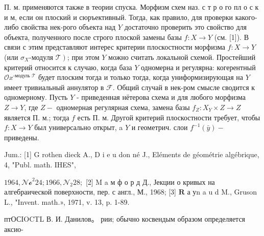 \documentclass[10pt]{article}
\begin{document}
П. м. применяются также в теории спуска. Морфизм схем наз. с т р о го пл о с к и м, если он плоский и сюръективный. Тогда, как правило, для проверки какого-либо свойства нек-рого объекта над $Y$ достаточно проверить это свойство для объекта, полученного после строго плоской замены базы $f: X \rightarrow Y$ (см. [1]). В связи с этим представляют интерес критерии плоскостности морфизма $f: X \rightarrow Y$ (или $\sigma_{X}$-модуля $\left.\mathscr{T}\right)$; при этом $Y$ можно считать локальной схемой. Простейший критерий относится к случаю, когда база $Y$ одномерна и регулярна: когерентный $\mathcal{O} x^{\text {-модуль } \mathscr{T}}$ будет плоским тогда и только тогда, когда униформизирующая на $Y$ имеет тривиальный аннулятор в $\mathscr{F}$. Общий случай в нек-ром смысле сводится к одномерному. Пусть $Y$ - приведенная нётерова схема и для любого морфизма $Z \rightarrow Y$, где $Z-$ одномерная регулярная схема, замена базы $f_{Z}: X_{Y} \times Z \rightarrow Z$ является П. м.; тогда $f$ есть П. м. Другой критерий плоскостности требует, чтобы $f: X \rightarrow Y$ был универсально открыт, a $Y$ и геометрич. слои $f^{-1}(\bar{y})-$ приведены.



Jum.: [1] G rothen dieck A., D i e u don né J., Eléments de géométrie algébrique, 4, "Publ. math. IHES",

$1964, \mathcal{N o}^{2} 24 ; 1966, \mathcal{N}_{2} 28 ;$ [2] M a м ф о р д Д., Јекции о кривых на алгебраической поверхности, пер. с англ., М., 1968; [3] $\mathbf{R}$ а уn a u d M., Gruson L., "Invent. math.», 1971, v. 13, p. 1-89.



птОСIOCTL В. И. Данилов。 рии; обычно косвендым образом определяется аксио-
\end{document}

